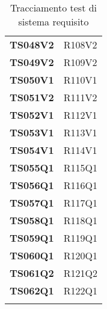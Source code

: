 \documentclass[../../piano-di-qualifica.tex]{subfiles}
\begin{document}
\begin{longtable}[H]{>{\centering\bfseries}m{5cm} >{\centering\arraybackslash}m{5cm}}
  TS048V2            & R108V2                            \\
  TS049V2            & R109V2                            \\
  TS050V1            & R110V1                            \\
  TS051V2            & R111V2                            \\
  TS052V1            & R112V1                            \\
  TS053V1            & R113V1                            \\
  TS054V1            & R114V1                            \\
  TS055Q1            & R115Q1                            \\
  TS056Q1            & R116Q1                            \\
  TS057Q1            & R117Q1                            \\
  TS058Q1            & R118Q1                            \\
  TS059Q1            & R119Q1                            \\
  TS060Q1            & R120Q1                            \\
  TS061Q2            & R121Q2                            \\
  TS062Q1            & R122Q1                            \\







  \rowcolor{white}
  \caption{Tracciamento test di sistema \- requisito}%
  \label{tab:test_sistema_requisito}
\end{longtable}
\end{document}
